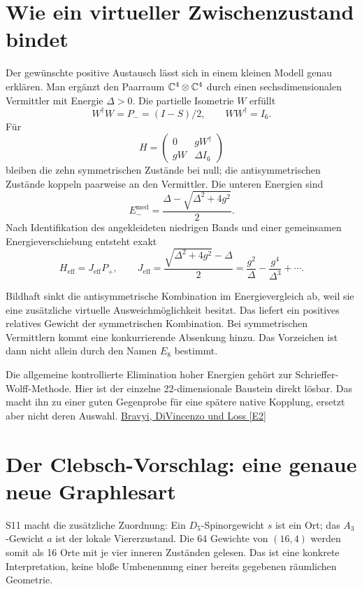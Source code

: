 \section{Wie ein virtueller Zwischenzustand bindet}
Der gewünschte positive Austausch lässt sich in einem kleinen Modell genau erklären. Man ergänzt den Paarraum $\mathbb C^4\otimes\mathbb C^4$ durch einen sechsdimensionalen Vermittler mit Energie $\Delta>0$. Die partielle Isometrie $W$ erfüllt
\begin{equation}
W^\dagger W=P_-=(I-S)/2,\qquad WW^\dagger=I_6.
\end{equation}
Für
\begin{equation}
H=\begin{pmatrix}0&gW^\dagger\\gW&\Delta I_6\end{pmatrix}
\end{equation}
bleiben die zehn symmetrischen Zustände bei null; die antisymmetrischen Zustände koppeln paarweise an den Vermittler. Die unteren Energien sind
\begin{equation}
E_-^{\mathrm{med}}=\frac{\Delta-\sqrt{\Delta^2+4g^2}}2.
\end{equation}
Nach Identifikation des angekleideten niedrigen Bands und einer gemeinsamen Energieverschiebung entsteht exakt
\begin{equation}
H_{\mathrm{eff}}=J_{\mathrm{eff}}P_+,\qquad
J_{\mathrm{eff}}=\frac{\sqrt{\Delta^2+4g^2}-\Delta}{2}
=\frac{g^2}{\Delta}-\frac{g^4}{\Delta^3}+\cdots.
\end{equation}

Bildhaft sinkt die antisymmetrische Kombination im Energievergleich ab, weil sie eine zusätzliche virtuelle Ausweichmöglichkeit besitzt. Das liefert ein positives relatives Gewicht der symmetrischen Kombination. Bei symmetrischen Vermittlern kommt eine konkurrierende Absenkung hinzu. Das Vorzeichen ist dann nicht allein durch den Namen $E_8$ bestimmt.

Die allgemeine kontrollierte Elimination hoher Energien gehört zur Schrieffer-Wolff-Methode. Hier ist der einzelne 22-dimensionale Baustein direkt lösbar. Das macht ihn zu einer guten Gegenprobe für eine spätere native Kopplung, ersetzt aber nicht deren Auswahl. \href{https://arxiv.org/abs/1105.0675}{Bravyi, DiVincenzo und Loss [E2]}

\section{Der Clebsch-Vorschlag: eine genaue neue Graphlesart}
S11 macht die zusätzliche Zuordnung: Ein $D_5$-Spinorgewicht $s$ ist ein Ort; das $A_3$-Gewicht $a$ ist der lokale Viererzustand. Die 64 Gewichte von $(16,4)$ werden somit als 16 Orte mit je vier inneren Zuständen gelesen. Das ist eine konkrete  Interpretation, keine bloße Umbenennung einer bereits gegebenen räumlichen Geometrie.

